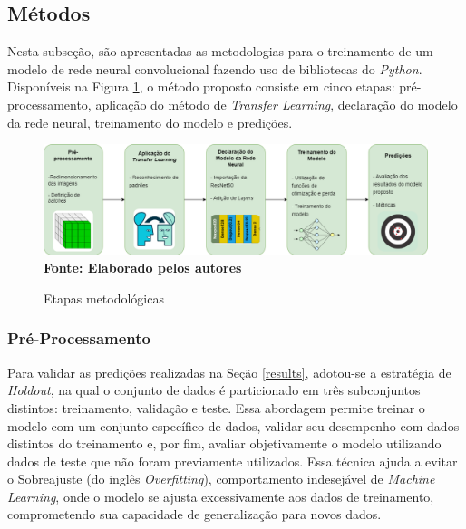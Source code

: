 \subsection{\esp Métodos} \label{metodos}

Nesta subseção, são apresentadas as metodologias para o treinamento de um modelo de rede neural convolucional fazendo uso de bibliotecas do \textit{Python}. Disponíveis na Figura \ref{fig:diagrama}, o método proposto consiste em cinco etapas: pré-processamento, aplicação do método de \textit{Transfer Learning}, declaração do modelo da rede neural, treinamento do modelo e predições.

\begin{figure}[ht]
 	\centering	
 	\caption[\hspace{0.1cm}Grade Computacional.]{Etapas metodológicas}
 	\vspace{-0.2cm}
 	\includegraphics[width=1\textwidth]{figuras/tcc_diagrama.drawio.png}
    \captionsetup{justification=centering}
  \vspace{-0.2cm}
     \\\textbf{\footnotesize Fonte: Elaborado pelos autores}
	\label{fig:diagrama}
\end{figure}




\subsubsection{\esp Pré-Processamento} \label{preprocess}

Para validar as predições realizadas na Seção \ref{results}, adotou-se a estratégia de \textit{Holdout}, na qual o conjunto de dados é particionado em três subconjuntos distintos: treinamento, validação e teste. Essa abordagem permite treinar o modelo com um conjunto específico de dados, validar seu desempenho com dados distintos do treinamento e, por fim, avaliar objetivamente o modelo utilizando dados de teste que não foram previamente utilizados. Essa técnica ajuda a evitar o Sobreajuste (do inglês \textit{Overfitting}), comportamento indesejável de \textit{Machine Learning}, onde o modelo se ajusta excessivamente aos dados de treinamento, comprometendo sua capacidade de generalização para novos dados.

